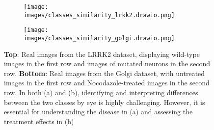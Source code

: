 \begin{figure}[h]
  \centering
  \begin{subfigure}{\linewidth}
    \centering
    \texttt{[image: images/classes\_similarity\_lrkk2.drawio.png]} %
    \caption{}
    \label{fig:subfigure1}
  \end{subfigure}

  \vspace{0.5cm} %

  \begin{subfigure}{\linewidth}
    \centering
    \texttt{[image: images/classes\_similarity\_golgi.drawio.png]} %
    \caption{}
    \label{fig:subfigure2}
  \end{subfigure}

  \caption{\textbf{Top}: Real images from the LRRK2 dataset, displaying wild-type images in the first row and images of mutated neurons in the second row. \textbf{Bottom}: Real images from the Golgi dataset, with untreated images in the first row and Nocodazole-treated images in the second row. In both (a) and (b), identifying and interpreting differences between the two classes by eye is highly challenging. However, it is essential for understanding the disease in (a) and assessing the treatment effects in (b)}
  \label{fig:example}
\end{figure}





